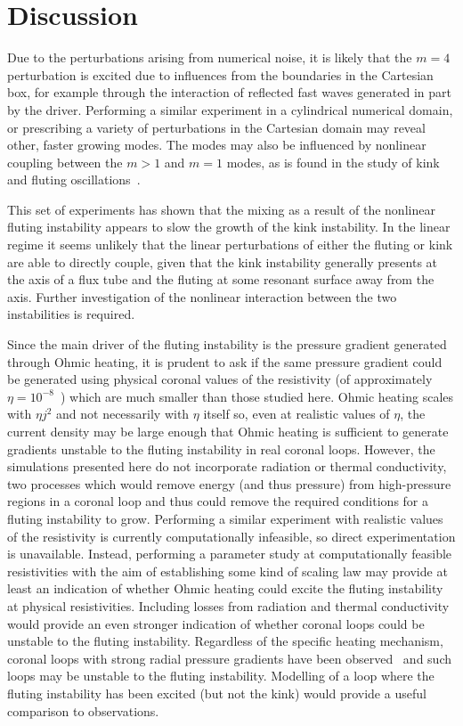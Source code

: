 \section{Discussion}

Due to the perturbations arising from numerical noise, it is likely that the $m=4$ perturbation is excited due to influences from the boundaries in the Cartesian box, for example through the interaction of reflected fast waves generated in part by the driver. Performing a similar experiment in a cylindrical numerical domain, or prescribing a variety of perturbations in the Cartesian domain may reveal other, faster growing modes. The modes may also be influenced by nonlinear coupling between the $m>1$ and $m=1$ modes, as is found in the study of kink and fluting oscillations~\cite{terradasEffectMagneticTwist2018,rudermanNonlinearGenerationFluting2017a}.

This set of experiments has shown that the mixing as a result of the nonlinear fluting instability appears to slow the growth of the kink instability. In the linear regime it seems unlikely that the linear perturbations of either the fluting or kink are able to directly couple, given that the kink instability generally presents at the axis of a flux tube and the fluting at some resonant surface away from the axis. Further investigation of the nonlinear interaction between the two instabilities is required.

Since the main driver of the fluting instability is the pressure gradient generated through Ohmic heating, it is prudent to ask if the same pressure gradient could be generated using physical coronal values of the resistivity (of approximately $\eta=10^{-8}$~\cite{craigAnisotropicViscousDissipation2009a}) which are much smaller than those studied here. Ohmic heating scales with $\eta j^2$ and not necessarily with $\eta$ itself so, even at realistic values of $\eta$, the current density may be large enough that Ohmic heating is sufficient to generate gradients unstable to the fluting instability in real coronal loops. However, the simulations presented here do not incorporate radiation or thermal conductivity, two processes which would remove energy (and thus pressure) from high-pressure regions in a coronal loop and thus could remove the required conditions for a fluting instability to grow. Performing a similar experiment with realistic values of the resistivity is currently computationally infeasible, so direct experimentation is unavailable. Instead, performing a parameter study at computationally feasible resistivities with the aim of establishing some kind of scaling law may provide at least an indication of whether Ohmic heating could excite the fluting instability at physical resistivities. Including losses from radiation and thermal conductivity would provide an even stronger indication of whether coronal loops could be unstable to the fluting instability. Regardless of the specific heating mechanism, coronal loops with strong radial pressure gradients have been observed~\cite{foukalTemperatureStructurePressure1975} and such loops may be unstable to the fluting instability. Modelling of a loop where the fluting instability has been excited (but not the kink) would provide a useful comparison to observations.

